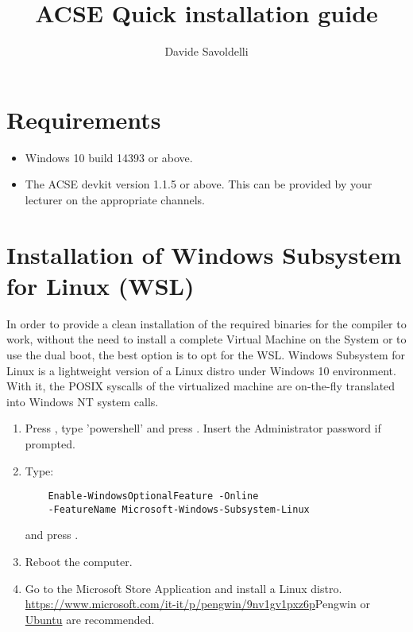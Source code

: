 \documentclass{article}
\begin{document}
\title{ACSE Quick installation guide}
\author{Davide Savoldelli}

\maketitle

\section{Requirements}
\begin{itemize}
    \item Windows 10 build 14393 or above.
    \item The ACSE devkit version 1.1.5 or above. This can be provided by your lecturer on the appropriate channels.
\end{itemize}

\section{Installation of Windows Subsystem for Linux (WSL)}
In order to provide a clean installation of the required binaries for the compiler to work, without the need to install 
a complete Virtual Machine on the System or to use the dual boot, the best option is to opt for
the WSL. Windows Subsystem for Linux is a lightweight version of a Linux distro under Windows 10 environment.
With it, the POSIX syscalls of the virtualized machine are on-the-fly translated into Windows NT system calls.
\begin{enumerate}
\item Press , type 'powershell' and press \keys{\ctrl + \shift + \enter}. Insert the Administrator password if prompted.
    \item Type: 
    \begin{verbatim} 
    Enable-WindowsOptionalFeature -Online 
    -FeatureName Microsoft-Windows-Subsystem-Linux \end{verbatim} and press \keys{\enter}.
    \item Reboot the computer.
    \item Go to the Microsoft Store Application and install a Linux distro. \url{https://www.microsoft.com/it-it/p/pengwin/9nv1gv1pxz6p}{Pengwin} or \href{https://www.microsoft.com/it-it/p/ubuntu/9nblggh4msv6}{Ubuntu} are recommended.
  \end{enumerate}
\end{document}
